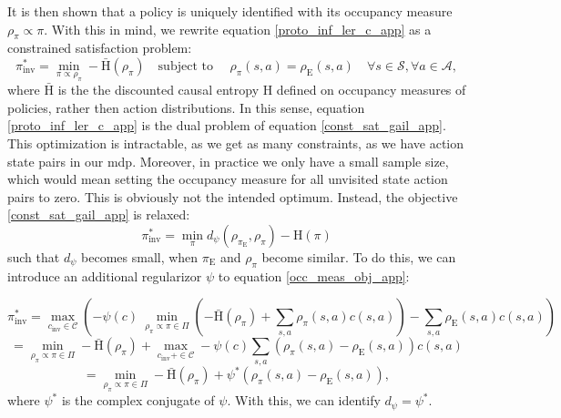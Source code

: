 It is then shown that a policy is uniquely identified with its occupancy measure $\rho_{\pi} \propto \pi$. With this in mind, we rewrite equation \ref{proto_inf_ler_c_app} as a constrained satisfaction problem:
\begin{equation}
    \label{const_sat_gail_app}
    \pi_{\text{inv}}^* = \min_{\pi \propto \rho_{\pi}} - \bar{\text{H}}(\rho_{\pi})\quad \text{subject to }\quad \rho_{\pi}(s,a) = \rho_{\text{E}}(s,a) \quad \forall s \in \mathcal{S}, \forall a \in \mathcal{A},
\end{equation}
where $\bar{\text{H}}$ is the the discounted causal entropy $\text{H}$ defined on occupancy measures of policies, rather then action distributions. In this sense, equation \ref{proto_inf_ler_c_app} is the dual problem of equation \ref{const_sat_gail_app}. 
This optimization is intractable, as we get as many constraints, as we have action state pairs in our \ac{mdp}. Moreover, in practice we only have a small sample size, which would mean setting 
the occupancy measure for all unvisited state action pairs to zero. This is obviously not the intended optimum. Instead, the objective \ref{const_sat_gail_app} is relaxed:
\begin{equation}
    \label{dist_opt_app}
    \pi_{\text{inv}}^* = \min_{\pi} d_{\psi}(\rho_{\pi_{\text{E}}}, \rho_{\pi}) - \text{H}(\pi)
\end{equation}
such that $d_{\psi}$ becomes small, when $\pi_{\text{E}}$ and $\rho_{\pi}$ become similar. To do this, we can introduce an additional regularizor $\psi$ to equation \ref{occ_meas_obj_app}:

\begin{equation*}
    \pi_{\text{inv}}^* = \max_{c_{\text{inv}} \in \mathcal{C}} \left(-\psi(c) \ \min_{\rho_\pi \propto \pi \in \Pi} \left(- \bar{\text{H}}(\rho_\pi) + \sum_{s,a} \rho_\pi(s,a) c(s,a) \right) - \sum_{s,a} \rho_{\text{E}}(s,a) c(s,a) \right)
\end{equation*}
\begin{equation*}
    = \min_{\rho_\pi \propto \pi \in \Pi}- \bar{\text{H}}(\rho_\pi) + \max_{c_{\text{inv}} + \in \mathcal{C}} -\psi(c) \sum_{s,a} \left( \rho_\pi(s,a) - \rho_{\text{E}}(s,a)\right) c(s,a)
\end{equation*}
\begin{equation}
    \label{proto_inf_ler_c_reg_app}
    = \min_{\rho_\pi \propto \pi \in \Pi}- \bar{\text{H}}(\rho_\pi) + \psi^*(\rho_\pi(s,a) - \rho_{\text{E}}(s,a)),
\end{equation}
where $\psi^*$ is the complex conjugate of $\psi$. With this, we can identify $d_{\psi} = \psi^*$.\\

